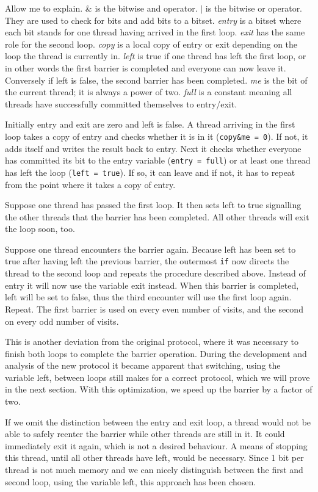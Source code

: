 \documentclass[a4paper, 10pt]{article}
\begin{document}
Allow me to explain. \& is the bitwise and operator. $|$ is the bitwise or operator. They are used to check for bits and add bits to a bitset. \emph{entry} is a bitset where each bit stands for one thread having arrived in the first loop. \emph{exit} has the same role for the second loop. \emph{copy} is a local copy of entry or exit depending on the loop the thread is currently in. \emph{left} is true if one thread has left the first loop, or in other words the first barrier is completed and everyone can now leave it. Conversely if left is false, the second barrier has been completed. \emph{me} is the bit of the current thread; it is always a power of two. \emph{full} is a constant meaning all threads have successfully committed themselves to entry/exit.

Initially entry and exit are zero and left is false. A thread arriving in the first loop takes a copy of entry and checks whether it is in it (\texttt{copy\&me = 0}). If not, it adds itself and writes the result back to entry. Next it checks whether everyone has committed its bit to the entry variable (\texttt{entry = full}) or at least one thread has left the loop (\texttt{left = true}). If so, it can leave and if not, it has to repeat from the point where it takes a copy of entry.

Suppose one thread has passed the first loop. It then sets left to true signalling the other threads that the barrier has been completed. All other threads will exit the loop soon, too.

Suppose one thread encounters the barrier again. Because left has been set to true after having left the previous barrier, the outermost \texttt{if} now directs the thread to the second loop and repeats the procedure described above. Instead of entry it will now use the variable exit instead. When this barrier is completed, left will be set to false, thus the third encounter will use the first loop again. Repeat. The first barrier is used on every even number of visits, and the second on every odd number of visits.

This is another deviation from the original protocol, where it was necessary to finish both loops to complete the barrier operation. During the development and analysis of the new protocol it became apparent that switching, using the variable left, between loops still makes for a correct protocol, which we will prove in the next section. With this optimization, we speed up the barrier by a factor of two.

If we omit the distinction between the entry and exit loop, a thread would not be able to safely reenter the barrier while other threads are still in it. It could immediately exit it again, which is not a desired behaviour. A means of stopping this thread, until all other threads have left, would be necessary. Since 1 bit per thread is not much memory and we can nicely distinguish between the first and second loop, using the variable left, this approach has been chosen.
\end{document}
